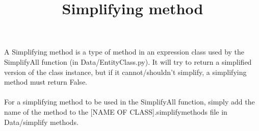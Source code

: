 \documentclass[11pt]{article}
\title{Simplifying method}
\begin{document}
\maketitle
A Simplifying method is a type of method in an expression class used by the SimplifyAll function (in Data/EntityClass.py). It will try to return a simplified version of the class instance, but if it cannot/shouldn't simplify, a simplifying method must return False.
\\\\ For a simplifying method to be used in the SimplifyAll function, simply add the name of the method to the [NAME OF CLASS].simplifymethods file in Data/simplify methods. 
\end{document}
